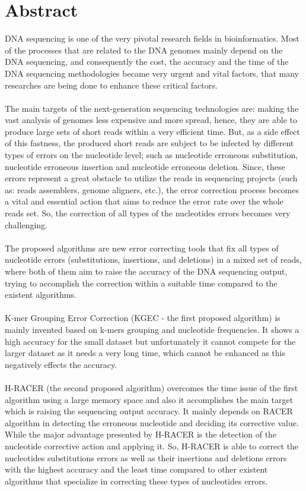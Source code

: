 \documentclass[12pt,openany]{llncs}
\begin{document}
\section*{Abstract}\thispagestyle{fancy}
DNA sequencing is one of the very pivotal research fields in bioinformatics. Most of the processes that are related to the DNA genomes mainly depend on the DNA sequencing, and consequently the cost, the accuracy and the time of the DNA sequencing methodologies became very urgent and vital factors, that many researches are being done to enhance these critical factors.
\\
\\
The main targets of the next-generation sequencing technologies are: making the vast analysis of genomes less expensive and more spread, hence, they are able to produce large sets of short reads within a very efficient time. But, as a side effect of this fastness, the produced short reads are subject to be infected by different types of errors on the nucleotide level; such as nucleotide erroneous substitution, nucleotide erroneous insertion and nucleotide erroneous deletion. Since, these errors represent a great obstacle to utilize the reads in sequencing projects (such as: reads assemblers, genome aligners, etc.), the error correction process becomes a vital and essential action that aims to reduce the error rate over the whole reads set. So, the correction of all types of the nucleotides errors becomes very challenging.
\\
\\ 
The proposed algorithms are new error correcting tools that fix all types of nucleotide errors (substitutions, insertions, and deletions) in a mixed set of reads, where both of them aim to raise the accuracy of the DNA sequencing output, trying to accomplish the correction within a suitable time compared to the existent algorithms. 
\\
\\
K-mer Grouping Error Correction (KGEC - the first proposed algorithm) is mainly invented based on k-mers grouping and nucleotide frequencies. It shows a high accuracy for the small dataset but unfortunately it cannot compete for the larger dataset as it needs a very long time, which cannot be enhanced as this negatively effects the accuracy.
\\
\\
H-RACER (the second proposed algorithm) overcomes the time issue of the first algorithm using a large memory space and also it accomplishes the main target which is raising the sequencing output accuracy. It mainly depends on RACER algorithm in detecting the erroneous nucleotide and deciding its corrective value. While the major advantage presented by H-RACER is the detection of the nucleotide corrective action and applying it. So, H-RACER is able to correct the nucleotides substitutions errors as well as their insertions and deletions errors with the highest accuracy and the least time compared to other existent algorithms that specialize in correcting these types of nucleotides errors.
\end{document}

